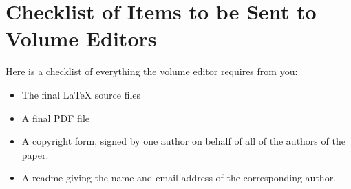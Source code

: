 \documentclass[runningheads,a4paper]{llncs}
\begin{document}

\section{Checklist of Items to be Sent to Volume Editors}
Here is a checklist of everything the volume editor requires from you:

\begin{itemize}
\settowidth{\leftmargin}{{\Large$\square$}}\advance\leftmargin{}
\itemsep8pt\relax
\renewcommand\labelitemi{{\lower1.5pt\hbox{\Large$\square$}}}

\item The final \LaTeX{} source files
\item A final PDF file
\item A copyright form, signed by one author on behalf of all of the
authors of the paper.
\item A readme giving the name and email address of the
corresponding author.
\end{itemize}
\end{document}
